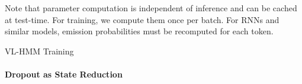 \documentclass[11pt,a4paper]{article}
\begin{document}
Note that parameter computation is independent of inference and can be cached at test-time.
For training, we compute them once per batch. 
For RNNs and similar models, %
emission probabilities must be recomputed for each token. 


\begin{algorithm}[t]
\begin{algorithmic}
    \EndFor
\begin{comment}
\Function{LogPotentials}{}
    \State{Given sequence $\bx = \langle x_1,\ldots,x_T \rangle$,
    constraints $\mcC_x$ with $|\mcC_x| = k$,
    transition parameters $\psi$,
    and emission parameters $\phi$}
    \State{Initialize $\Phi \in \mathbb{R}^{T \times k \times k} = 0$}
    \ForAll{$t\in \set{1,\ldots,T}$}
        \State{Set $\Phi[t,:,:] += \psi[x]$}
        \State{Set $\Phi[t,:,:] += \psi[x]$}
    \EndFor
    \State \Return meh \Comment{$O(1)$}
\EndFunction
\Function{Forward}{}
    \For{meh}
        \State{meh}
    \EndFor
    \State \Return meh \Comment{$O(1)$}
\EndFunction
\end{comment}
\end{algorithmic}
\caption{
\label{fig:algo}
VL-HMM Training
}
\end{algorithm}


\paragraph{Dropout as State Reduction}

\end{document}
